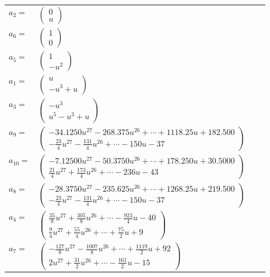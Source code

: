 \documentclass[1p]{elsarticle_modified}
\theoremstyle{definition}
\begin{document}
\begin{tabular}{m{7pt} m{180pt} m{7pt} m{180pt} }
\flushright $a_{2}=$&$\begin{pmatrix}0\\u\end{pmatrix}$ \\
\flushright $a_{6}=$&$\begin{pmatrix}1\\0\end{pmatrix}$ \\
\flushright $a_{5}=$&$\begin{pmatrix}1\\- u^2\end{pmatrix}$ \\
\flushright $a_{1}=$&$\begin{pmatrix}u\\- u^3+u\end{pmatrix}$ \\
\flushright $a_{3}=$&$\begin{pmatrix}- u^3\\u^5- u^3+u\end{pmatrix}$ \\
\flushright $a_{9}=$&$\begin{pmatrix}-34.1250 u^{27}-268.375 u^{26}+\cdots+1118.25 u+182.500\\-\frac{23}{4} u^{27}-\frac{131}{4} u^{26}+\cdots-150 u-37\end{pmatrix}$ \\
\flushright $a_{10}=$&$\begin{pmatrix}-7.12500 u^{27}-50.3750 u^{26}+\cdots+178.250 u+30.5000\\\frac{21}{4} u^{27}+\frac{173}{4} u^{26}+\cdots-236 u-43\end{pmatrix}$ \\
\flushright $a_{8}=$&$\begin{pmatrix}-28.3750 u^{27}-235.625 u^{26}+\cdots+1268.25 u+219.500\\-\frac{23}{4} u^{27}-\frac{131}{4} u^{26}+\cdots-150 u-37\end{pmatrix}$ \\
\flushright $a_{4}=$&$\begin{pmatrix}\frac{35}{8} u^{27}+\frac{305}{8} u^{26}+\cdots-\frac{923}{4} u-40\\\frac{9}{4} u^{27}+\frac{55}{4} u^{26}+\cdots+\frac{75}{2} u+9\end{pmatrix}$ \\
\flushright $a_{7}=$&$\begin{pmatrix}-\frac{127}{8} u^{27}-\frac{1007}{8} u^{26}+\cdots+\frac{1119}{2} u+92\\2 u^{27}+\frac{31}{2} u^{26}+\cdots-\frac{161}{2} u-15\end{pmatrix}$ \\

\end{tabular}
\end{document}
